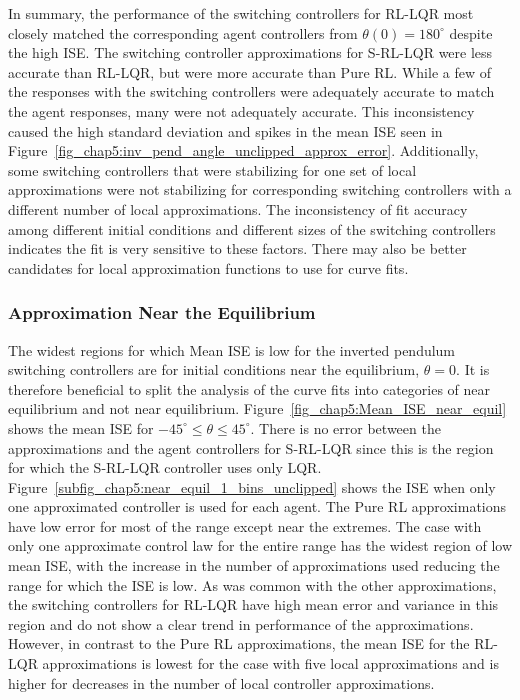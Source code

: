 In summary, the performance of the switching controllers for RL-LQR most closely matched the corresponding agent controllers from $\theta(0)=180^\circ$ despite the high ISE. The switching controller approximations for S-RL-LQR were less accurate than RL-LQR, but were more accurate than Pure RL. While a few of the responses with the switching controllers were adequately accurate to match the agent responses, many were not adequately accurate. This inconsistency caused the high standard deviation and spikes in the mean ISE seen in Figure~\ref{fig_chap5:inv_pend_angle_unclipped_approx_error}. Additionally, some switching controllers that were stabilizing for one set of local approximations were not stabilizing for corresponding switching controllers with a different number of local approximations. The inconsistency of fit accuracy among different initial conditions and different sizes of the switching controllers indicates the fit is very sensitive to these factors. There may also be better candidates for local approximation functions to use for curve fits.

\subsubsection{Approximation Near the Equilibrium}

The widest regions for which Mean ISE is low for the inverted pendulum switching controllers are for initial conditions near the equilibrium, $\theta=0$. It is therefore beneficial to split the analysis of the curve fits into categories of near equilibrium and not near equilibrium.
%
Figure~\ref{fig_chap5:Mean_ISE_near_equil} shows the mean ISE for $-45^\circ\le\theta\le45^\circ$.
%
There is no error between the approximations and the agent controllers for S-RL-LQR since this is the region for which the S-RL-LQR controller uses only LQR.
Figure~\ref{subfig_chap5:near_equil_1_bins_unclipped} shows the ISE when only one approximated controller is used for each agent. The Pure RL approximations have low error for most of the range except near the extremes. The case with only one approximate control law for the entire range has the widest region of low mean ISE, with the increase in the number of approximations used reducing the range for which the ISE is low. As was common with the other approximations, the switching controllers for RL-LQR have high mean error and variance in this region and do not show a clear trend in performance of the approximations.
%
However, in contrast to the Pure RL approximations, the mean ISE for the RL-LQR approximations is lowest for the case with five local approximations and is higher for decreases in the number of local controller approximations.

